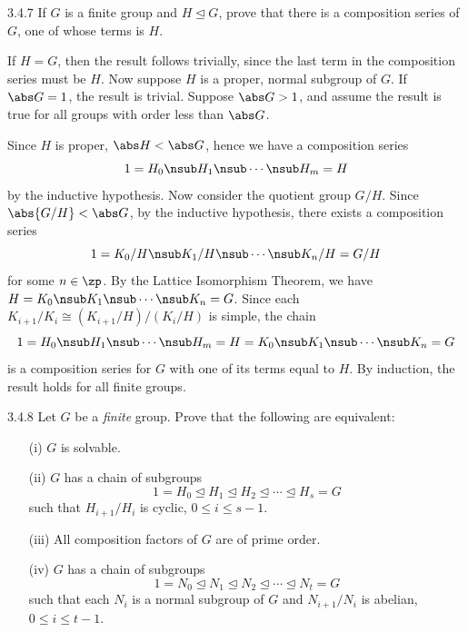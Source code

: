 \begin{exercise}{3.4.7}
    If $G$ is a finite group and $H \trianglelefteq G$, prove that there is a composition series of $G$, one of whose terms is $H$.
\end{exercise}

\begin{sol}
    If $H = G$, then the result follows trivially, since the last term in the composition series must be $H$.
	Now suppose $H$ is a proper, normal subgroup of $G$.
	If $\abs G = 1$, the result is trivial.
	Suppose $\abs G > 1$, and assume the result is true for all groups with order less than $\abs G$.

    Since $H$ is proper, $\abs H < \abs G$, hence we have a composition series
    \[
    	1 = H_0 \nsub H_1 \nsub \cdots \nsub H_m = H
    \]
    by the inductive hypothesis.
	Now consider the quotient group $G/H$.
	Since $\abs{G/H} < \abs G$, by the inductive hypothesis, there exists a composition series
    \[
    	1 = K_0/H \nsub K_1/H \nsub \cdots \nsub K_n/H = G/H
    \]
    for some $n \in \zp$.
	By the Lattice Isomorphism Theorem, we have $H = K_0 \nsub K_1 \nsub \cdots \nsub K_n = G$.
	Since each $K_{i + 1}/K_i \cong (K_{i + 1}/H)/(K_i/H)$ is simple, the chain
    \[
    	1 = H_0 \nsub H_1 \nsub \cdots \nsub H_m = H = K_0 \nsub K_1 \nsub \cdots \nsub K_n = G
    \]
    is a composition series for $G$ with one of its terms equal to $H$.
	By induction, the result holds for all finite groups.
\end{sol}

\begin{exercise}{3.4.8}
    Let $G$ be a \emph{finite} group.
	Prove that the following are equivalent:
    \begin{enumerate}
        \item[(i)] $G$ is solvable.
        \item[(ii)] $G$ has a chain of subgroups
        \[
        	1 = H_0 \trianglelefteq H_1 \trianglelefteq H_2 \trianglelefteq \cdots \trianglelefteq H_s = G
        \]
        such that $H_{i+1}/H_i$ is cyclic, $0 \leq i \leq s-1$.
        \item[(iii)] All composition factors of $G$ are of prime order.
        \item[(iv)] $G$ has a chain of subgroups
        \[
        	1 = N_0 \trianglelefteq N_1 \trianglelefteq N_2 \trianglelefteq \cdots \trianglelefteq N_t = G
        \]
        such that each $N_i$ is a normal subgroup of $G$ and $N_{i+1}/N_i$ is abelian, $0 \leq i \leq t-1$.
    \end{enumerate}
    \noindent [For (iv), prove that a minimal nontrivial normal subgroup $M$ of $G$ is necessarily abelian and then use induction.
	To see that $M$ is abelian, let $N \trianglelefteq M$ be of prime index (by (iii)) and show that $x\inv y\inv xy \in N$ for all $x,y \in M$ (cf. \exref{3.1.40}).
	Apply the same argument to $gNg\inv$ to show that $x\inv y\inv xy$ lies in the intersection of all $G$-conjugates of $N$, and use the minimality of $M$ to conclude that $x\inv y\inv xy = 1$.]
\end{exercise}

